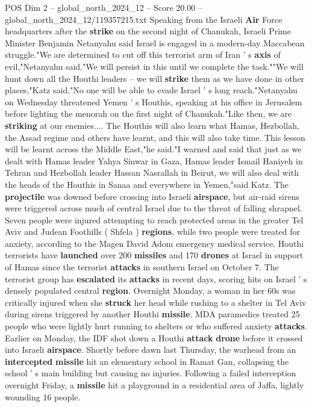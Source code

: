 \begin{textsample}{POS Dim 2 – global\_north\_2024\_12 – Score 20.00 – global\_north\_2024\_12/119357215.txt}
Speaking from the Israeli \textbf{Air} Force headquarters after the \textbf{strike} on the second night of Chanukah, Israeli Prime Minister Benjamin Netanyahu said Israel is engaged in a modern-day Maccabean struggle."We are determined to cut off this terrorist arm of Iran ' s \textbf{axis} of evil,"Netanyahu said."We will persist in this until we complete the task.""We will hunt down all the Houthi leaders -- we will \textbf{strike} them as we have done in other places,"Katz said."No one will be able to evade Israel ' s long reach."Netanyahu on Wednesday threatened Yemen ' s Houthis, speaking at his office in Jerusalem before lighting the menorah on the first night of Chanukah."Like then, we are \textbf{striking} at our enemies....
The Houthis will also learn what Hamas, Hezbollah, the Assad regime and others have learnt, and this will also take time.
This lesson will be learnt across the Middle East,"he said."I warned and said that just as we dealt with Hamas leader Yahya Sinwar in Gaza, Hamas leader Ismail Haniyeh in Tehran and Hezbollah leader Hassan Nasrallah in Beirut, we will also deal with the heads of the Houthis in Sanaa and everywhere in Yemen,"said Katz.
The \textbf{projectile} was downed before crossing into Israeli \textbf{airspace}, but air-raid sirens were triggered across much of central Israel due to the threat of falling shrapnel.
Seven people were injured attempting to reach protected areas in the greater Tel Aviv and Judean Foothills ( Shfela ) \textbf{regions}, while two people were treated for anxiety, according to the Magen David Adom emergency medical service.
Houthi terrorists have \textbf{launched} over 200 \textbf{missiles} and 170 \textbf{drones} at Israel in support of Hamas since the terrorist \textbf{attacks} in southern Israel on October 7.
The terrorist group has \textbf{escalated} its \textbf{attacks} in recent days, scoring hits on Israel ' s densely populated central \textbf{region}.
Overnight Monday, a woman in her 60s was critically injured when she \textbf{struck} her head while rushing to a shelter in Tel Aviv during sirens triggered by another Houthi \textbf{missile}.
MDA paramedics treated 25 people who were lightly hurt running to shelters or who suffered anxiety \textbf{attacks}.
Earlier on Monday, the IDF shot down a Houthi \textbf{attack} \textbf{drone} before it crossed into Israeli \textbf{airspace}.
Shortly before dawn last Thursday, the warhead from an \textbf{intercepted} \textbf{missile} hit an elementary school in Ramat Gan, collapsing the school ' s main building but causing no injuries.
Following a failed interception overnight Friday, a \textbf{missile} hit a playground in a residential area of Jaffa, lightly wounding 16 people.

\end{textsample}
